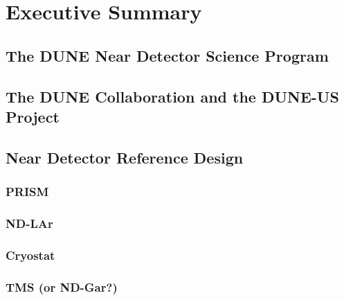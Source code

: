 \chapter{Executive Summary}
\label{ch:intro}


\section{The DUNE Near Detector Science Program}
\label{intro:science}


\section{The DUNE Collaboration and the DUNE-US Project}
\label{intro:collab-proj}


\section{Near Detector Reference Design}
\label{intro:refdes}

\subsection{PRISM}
\label{intro:refdes-prism}

\subsection{ND-LAr}
\label{intro:refdes-ndlar}

\subsection{Cryostat}
\label{intro:refdes-cryostat}

\subsection{TMS (or ND-Gar?)}
\label{intro:refdes-tms}






